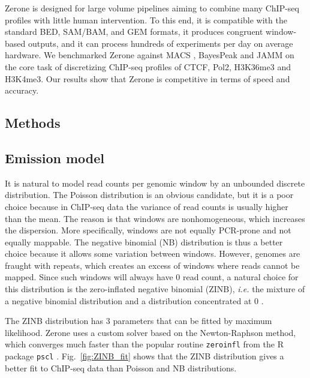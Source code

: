 \documentclass{bioinfo}
\begin{document}
Zerone is designed for large volume pipelines aiming to combine many
ChIP-seq profiles with little human intervention. To this end, it is
compatible with the standard BED, SAM/BAM, and GEM formats,
it produces congruent window-based outputs, and it can process hundreds
of experiments per day on average hardware. We benchmarked Zerone against
MACS \citep{pmid18798982}, BayesPeak \citep{pmid19772557} and
JAMM \citep{pmid25223640} on the core task of discretizing ChIP-seq
profiles of CTCF, Pol2, H3K36me3 and H3K4me3. Our results show that Zerone is
competitive in terms of speed and accuracy.
\begin{methods}
\section{Methods}


\subsection{Emission model}
\label{sub:emissions}
It is natural to model read counts per genomic window by an unbounded
discrete distribution. The Poisson distribution is an obvious candidate,
but it is a poor choice because in ChIP-seq data the variance of read
counts is usually higher than the mean. The reason is that windows
are nonhomogeneous, which increases the dispersion. More specifically,
windows are not equally PCR-prone and not equally mappable.
The negative binomial (NB) distribution is thus a better choice
because it allows some variation between windows. However, genomes
are fraught with repeats, which creates an excess of windows where
reads cannot be mapped. Since such windows will always have 0 read
count, a natural choice for this distribution is the zero-inflated
negative binomial (ZINB), \textit{i.e.} the mixture of a negative
binomial distribution and a distribution concentrated at 0
\citep{pmid21787385}.

The ZINB distribution has 3 parameters that can be fitted by maximum
likelihood. Zerone uses a custom solver based on the Newton-Raphson
method, which converges much faster than the popular routine
\texttt{zeroinfl} \citep{psclb} from the R \citep{R} package
\texttt{pscl} \citep{pscla}. Fig.~\ref{fig:ZINB_fit} shows that the
ZINB distribution gives a better fit to ChIP-seq data than Poisson
and NB distributions.


\end{methods}
\end{document}
